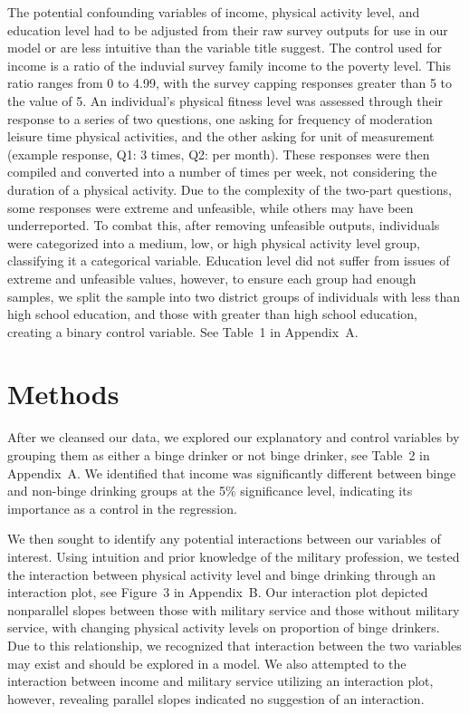 \documentclass[12pt]{article}
\begin{document}
The potential confounding variables of income, physical activity level, and education level had to be adjusted from their raw survey outputs for use in our model or are less intuitive than the variable title suggest. The control used for income is a ratio of the induvial survey family income to the poverty level. This ratio ranges from 0 to 4.99, with the survey capping responses greater than 5 to the value of 5. An individual's physical fitness level was assessed through their response to a series of two questions, one asking for frequency of moderation leisure time physical activities, and the other asking for unit of measurement (example response, Q1: 3 times, Q2: per month). These responses were then compiled and converted into a number of times per week, not considering the duration of a physical activity. Due to the complexity of the two-part questions, some responses were extreme and unfeasible, while others may have been underreported. To combat this, after removing unfeasible outputs, individuals were categorized into a medium, low, or high physical activity level group, classifying it a categorical variable. Education level did not suffer from issues of extreme and unfeasible values, however, to ensure each group had enough samples, we split the sample into two district groups of individuals with less than high school education, and those with greater than high school education, creating a binary control variable. See Table~1 in Appendix~A.

\section{Methods}

After we cleansed our data, we explored our explanatory and control variables by grouping them as either a binge drinker or not binge drinker, see Table~2 in Appendix~A. We identified that income was significantly different between binge and non-binge drinking groups at the 5\% significance level, indicating its importance as a control in the regression.

We then sought to identify any potential interactions between our variables of interest. Using intuition and prior knowledge of the military profession, we tested the interaction between physical activity level and binge drinking through an interaction plot, see Figure~3 in Appendix~B. Our interaction plot depicted nonparallel slopes between those with military service and those without military service, with changing physical activity levels on proportion of binge drinkers. Due to this relationship, we recognized that interaction between the two variables may exist and should be explored in a model. We also attempted to the interaction between income and military service utilizing an interaction plot, however, revealing parallel slopes indicated no suggestion of an interaction.
\end{document}
